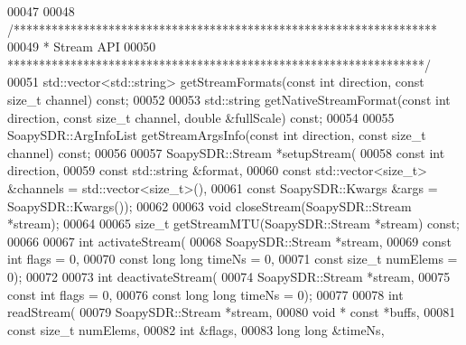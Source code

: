 \begin{DoxyCode}
00047 
00048     \textcolor{comment}{/*******************************************************************}
00049 \textcolor{comment}{     * Stream API}
00050 \textcolor{comment}{     ******************************************************************/}
00051     std::vector<std::string> getStreamFormats(\textcolor{keyword}{const} \textcolor{keywordtype}{int} direction, \textcolor{keyword}{const} \textcolor{keywordtype}{size\_t} channel) \textcolor{keyword}{const};
00052 
00053     std::string getNativeStreamFormat(\textcolor{keyword}{const} \textcolor{keywordtype}{int} direction, \textcolor{keyword}{const} \textcolor{keywordtype}{size\_t} channel, \textcolor{keywordtype}{double} &fullScale) \textcolor{keyword}{const};
00054 
00055     SoapySDR::ArgInfoList getStreamArgsInfo(\textcolor{keyword}{const} \textcolor{keywordtype}{int} direction, \textcolor{keyword}{const} \textcolor{keywordtype}{size\_t} channel) \textcolor{keyword}{const};
00056 
00057     SoapySDR::Stream *setupStream(
00058         \textcolor{keyword}{const} \textcolor{keywordtype}{int} direction,
00059         \textcolor{keyword}{const} std::string &format,
00060         \textcolor{keyword}{const} std::vector<size\_t> &channels = std::vector<size\_t>(),
00061         \textcolor{keyword}{const} SoapySDR::Kwargs &args = SoapySDR::Kwargs());
00062 
00063     \textcolor{keywordtype}{void} closeStream(SoapySDR::Stream *stream);
00064 
00065     \textcolor{keywordtype}{size\_t} getStreamMTU(SoapySDR::Stream *stream) \textcolor{keyword}{const};
00066 
00067     \textcolor{keywordtype}{int} activateStream(
00068         SoapySDR::Stream *stream,
00069         \textcolor{keyword}{const} \textcolor{keywordtype}{int} flags = 0,
00070         \textcolor{keyword}{const} \textcolor{keywordtype}{long} \textcolor{keywordtype}{long} timeNs = 0,
00071         \textcolor{keyword}{const} \textcolor{keywordtype}{size\_t} numElems = 0);
00072 
00073     \textcolor{keywordtype}{int} deactivateStream(
00074         SoapySDR::Stream *stream,
00075         \textcolor{keyword}{const} \textcolor{keywordtype}{int} flags = 0,
00076         \textcolor{keyword}{const} \textcolor{keywordtype}{long} \textcolor{keywordtype}{long} timeNs = 0);
00077 
00078     \textcolor{keywordtype}{int} readStream(
00079         SoapySDR::Stream *stream,
00080         \textcolor{keywordtype}{void} * \textcolor{keyword}{const} *buffs,
00081         \textcolor{keyword}{const} \textcolor{keywordtype}{size\_t} numElems,
00082         \textcolor{keywordtype}{int} &flags,
00083         \textcolor{keywordtype}{long} \textcolor{keywordtype}{long} &timeNs,

\end{DoxyCode}
